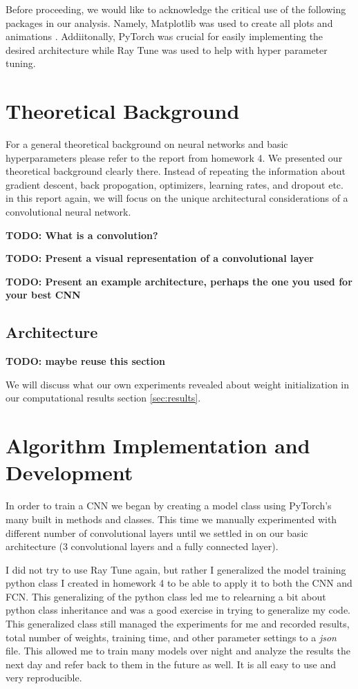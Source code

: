 \documentclass[11pt]{amsart}
\begin{document}
Before proceeding, we would like to acknowledge the critical use of the following packages in our analysis.
Namely, Matplotlib was used to create all plots and animations \cite{Hunter:2007}.
Addiitonally, PyTorch \cite{Ansel_PyTorch_2_Faster_2024} was crucial for easily implementing the desired architecture while Ray Tune \cite{liaw2018tune} was used to help with hyper parameter tuning.

\section{Theoretical Background}\label{sec:theory}
For a general theoretical background on neural networks and basic hyperparameters please refer to the report from homework 4.
We presented our theoretical background clearly there.
Instead of repeating the information about gradient descent, back propogation, optimizers, learning rates, and dropout etc. in this report again, we will focus on the unique architectural considerations of a convolutional neural network.

\textbf{TODO: What is a convolution?}

\textbf{TODO: Present a visual representation of a convolutional layer}

\textbf{TODO: Present an example architecture, perhaps the one you used for your best CNN}

\subsection{Architecture}
\textbf{TODO: maybe reuse this section}

We will discuss what our own experiments revealed about weight initialization in our computational results section \ref{sec:results}.

\section{Algorithm Implementation and Development}\label{sec:algorithms}
In order to train a CNN we began by creating a model class using PyTorch's \cite{Ansel_PyTorch_2_Faster_2024} many built in methods and classes.
This time we manually experimented with different number of convolutional layers until we settled in on our basic architecture (3 convolutional layers and a fully connected layer).

I did not try to use Ray Tune \cite{liaw2018tune} again, but rather I generalized the model training python class I created in homework 4 to be able to apply it to both the CNN and FCN.
This generalizing of the python class led me to relearning a bit about python class inheritance and was a good exercise in trying to generalize my code.
This generalized class still managed the experiments for me and recorded results, total number of weights, training time, and other parameter settings to a \textit{json} file.
This allowed me to train many models over night and analyze the results the next day and refer back to them in the future as well.
It is all easy to use and very reproducible.
\end{document}
